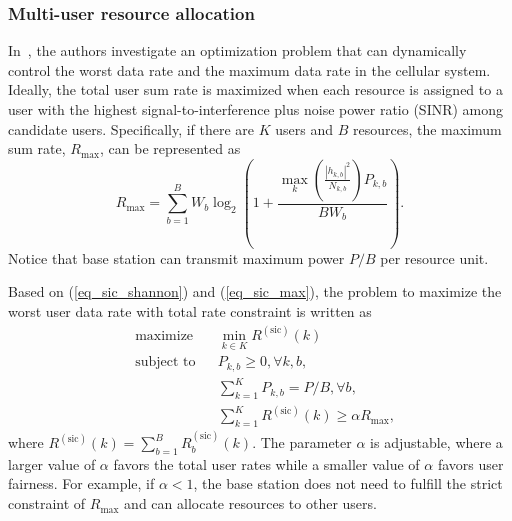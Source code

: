 \subsubsection{Multi-user resource allocation}
\label{sec_dynamic_ra}

In~\cite{cite_docomo2}, the authors investigate an optimization problem that can dynamically control the worst data rate and the maximum data rate in the cellular system. Ideally, the total user sum rate is maximized when each resource is assigned to a user with the highest signal-to-interference plus noise power ratio (SINR) among candidate users. Specifically, if there are $K$ users and $B$ resources, the maximum sum rate, $R_{\text{max}}$, can be represented as
\begin{equation}
\label{eq_sic_max}
R_{\text{max}}=\sum_{b=1}^B W_b \log_2 \left(1+\frac{\max\limits_{k} \left(\frac{|h_{k, b}|^2}{N_{k, b}}\right) P_{k, b}}{BW_b} \right).
\end{equation}
Notice that base station can transmit maximum power $P/B$ per resource unit.

Based on (\ref{eq_sic_shannon}) and (\ref{eq_sic_max}), the problem to maximize the worst user data rate with total rate constraint is written as
\begin{equation}
\label{eq_opt_fair}
\begin{aligned}
& \text{maximize}      & & \min_{k\in K} R^{(\text{sic})}(k) \\
& \text{subject to}     & & P_{k,b} \geq 0, \forall k, b, \\
&                              & & \sum_{k=1}^K P_{k,b}=P/B, \forall b, \\
&                              & & \sum_{k=1}^K R^{(\text{sic})}(k) \geq \alpha R_{\text{max}},
\end{aligned}
\end{equation}
where $R^{(\text{sic})}(k)=\sum_{b=1}^B R_b^{(\text{sic})}(k)$. The parameter $\alpha$ is adjustable, where a larger value of $\alpha$ favors the total user rates while a smaller value of $\alpha$ favors user fairness. For example, if $\alpha <1$, the base station does not need to fulfill the strict constraint of $R_{\text{max}}$ and can allocate resources to other users.

